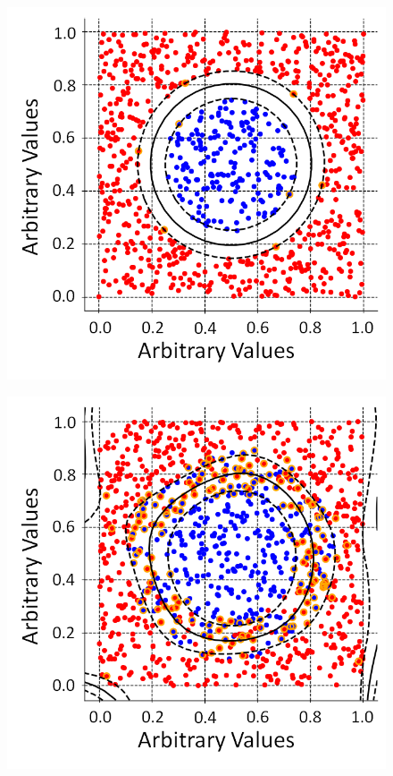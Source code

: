 \begin{figure}[!h]
\centering
\begin{minipage}{.45\textwidth}
  \centering
  \includegraphics[width=\linewidth]{Chapter4/Figs/adjustedSvmPlots/adjusted_CircleSepExample.png}
  \label{fig:CircleSepExample}
\end{minipage}%
\qquad
\begin{minipage}{.45\textwidth}
  \centering
  \includegraphics[width=\linewidth]{Chapter4/Figs/adjustedSvmPlots/adjusted_CircleNoSepExample.png}
  \label{fig:CircleNoSepExample}
\end{minipage}
\end{figure}

